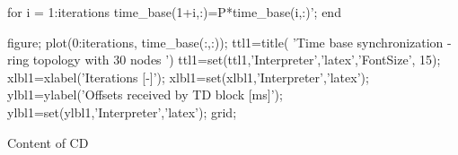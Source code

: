for i = 1:iterations
    time_base(1+i,:)=P*time_base(i,:)'; 
end

figure;
plot(0:iterations, time_base(:,:));
ttl1=title( 'Time base synchronization - ring topology with 30 nodes ')
ttl1=set(ttl1,'Interpreter','latex','FontSize', 15);
xlbl1=xlabel('Iterations [-]');
xlbl1=set(xlbl1,'Interpreter','latex');
ylbl1=ylabel('Offsets received by TD block [ms]');
ylbl1=set(ylbl1,'Interpreter','latex');
grid;

\endtt
\app Content of CD


